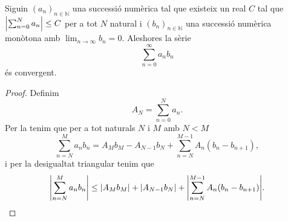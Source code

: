 \documentclass[../Apunts.tex]{subfiles}
\begin{document}
	\begin{theorem}
		\label{thm:Teorema de Dirichlet per sèries numèriques}
		Siguin \((a_{n})_{n\in\mathbb{N}}\) una successió numèrica tal que existeix un real \(C\) tal que \(\abs{\sum_{n=0}^{N}a_{n}}\leq C\) per a tot \(N\) natural i \((b_{n})_{n\in\mathbb{N}}\) una successió numèrica monòtona amb \(\lim_{n\to\infty}b_{n}=0\). Aleshores la sèrie
		\[\sum_{n=0}^{\infty}a_{n}b_{n}\]
		és convergent.
		\begin{proof}
			Definim
			\[A_{N}=\sum_{n=0}^{N}a_{n}.\]
			Per la  tenim que per a tot naturals \(N\) i \(M\) amb \(N<M\)
			\[\sum_{n=N}^{M}a_{n}b_{n}=A_{M}b_{M}-A_{N-1}b_{N}+\sum_{n=N}^{M-1}A_{n}(b_{n}-b_{n+1}),\]
			i per la desigualtat triangular %
			tenim que
			\begin{equation}
				\label{thm:Teorema de Dirichlet per sèries numèriques:eq1}
				\abs{\sum_{n=N}^{M}a_{n}b_{n}}\leq\abs{A_{M}b_{M}}+\abs{A_{N-1}b_{N}}+\abs{\sum_{n=N}^{M-1}A_{n}(b_{n}-b_{n+1})}.
			\end{equation}
			

\end{proof}
\end{theorem}
\end{document}

